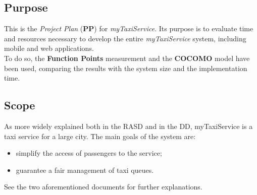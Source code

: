 \subsection{Purpose}
	This is the \textit{Project Plan} (\textbf{PP}) for \textit{myTaxiService}.
	Its purpose is to evaluate time and resources necessary to develop the entire \textit{myTaxiService} system, including mobile and web applications.\\
	To do so, the \textbf{Function Points} measurement and the \textbf{COCOMO} model have been used, comparing the results with the system size and the implementation time.

\subsection{Scope}
	As more widely explained both in the RASD and in the DD, myTaxiService
	is a taxi service for a large city. The main goals of the system
	are:
	\begin{itemize}
		\item simplify the access of passengers to the service;
		\item guarantee a fair management of taxi queues.
	\end{itemize}
	See the two aforementioned documents for further explanations.